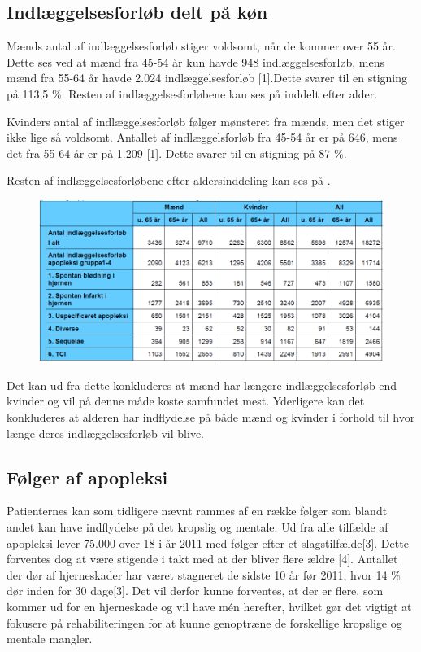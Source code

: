 \subsection{Indlæggelsesforløb delt på køn}
Mænds antal af indlæggelsesforløb stiger voldsomt, når de kommer over 55 år. Dette ses ved at mænd fra 45-54 år kun havde 948 indlæggelsesforløb, mens mænd fra 55-64 år havde 2.024 indlæggelsesforløb [1].Dette svarer til en stigning på 113,5 \%. Resten af indlæggelsesforløbene kan ses på  inddelt efter alder.

Kvinders antal af indlæggelsesforløb følger mønsteret fra mænds, men det stiger ikke lige så voldsomt. Antallet af indlæggelsforløb fra 45-54 år er på 646, mens det fra 55-64 år er på 1.209 [1]. Dette svarer til en stigning på 87 \%.

Resten af indlæggelsesforløbene efter aldersinddeling kan ses på . %

\begin{figure}[H]
	\centering
	\includegraphics[scale=1.0]{figures/bProblemanalyse/MaendKvinder.png}
	\caption{}
	\label{MK}
\end{figure}

Det kan ud fra dette konkluderes at mænd har længere indlæggelsesforløb end kvinder og vil på denne måde koste samfundet mest. Yderligere kan det konkluderes at alderen har indflydelse på både mænd og kvinder i forhold til hvor længe deres indlæggelsesforløb vil blive.

\subsection{Følger af apopleksi}
Patienternes kan som tidligere nævnt rammes af en række følger som blandt andet kan have indflydelse på det kropslig og mentale. Ud fra alle tilfælde af apopleksi lever 75.000 over 18 i år 2011 med følger efter et slagstilfælde[3]. Dette forventes dog at være stigende i takt med at der bliver flere ældre [4]. Antallet der dør af hjerneskader har været stagneret de sidste 10 år før 2011, hvor 14 \% dør inden for 30 dage[3]. Det vil derfor kunne forventes, at der er flere, som kommer ud for en hjerneskade og vil have mén herefter, hvilket gør det vigtigt at fokusere på rehabiliteringen for at kunne genoptræne de forskellige kropslige og mentale mangler.

